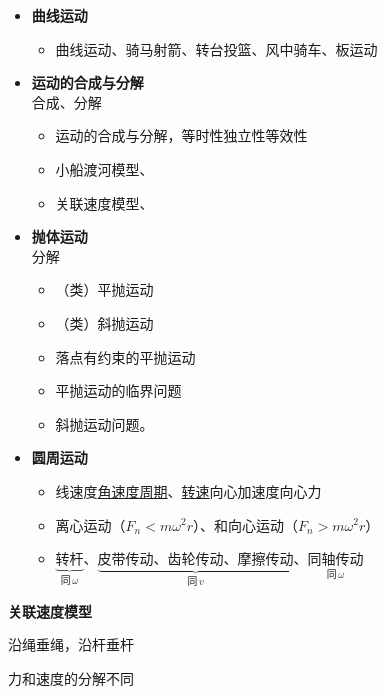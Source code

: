 \begin{itemize}
  \item \textbf{曲线运动}
  \begin{itemize}
    \item 曲线运动、骑马射箭、转台投篮、风中骑车、板运动
  \end{itemize}
  \item \textbf{运动的合成与分解}\\ 合成、分解
  \begin{itemize}
    \item 运动的合成与分解，\quad 等时性\quad 独立性\quad 等效性
    \item 小船渡河模型、
    \item 关联速度模型、 %
  \end{itemize}
  \item \textbf{抛体运动}\\ 分解
  \begin{itemize}
    \item （类）平抛运动
    \item （类）斜抛运动
    \item 落点有约束的平抛运动
    \item 平抛运动的临界问题
    \item 斜抛运动问题。
  \end{itemize}
  \item \textbf{圆周运动}\\ 
  \begin{itemize}
    \item 线速度\quad \underline{角速度}\quad \underline{周期}、\underline{转速}\quad 向心加速度\quad 向心力
    \item 离心运动（$F_n<m\omega^2 r$）、和向心运动（$F_n>m\omega^2 r$） %
    \item $\underbrace{\text{转杆}}_{\text{同}\,\omega}$、$\underbrace{\text{皮带传动、齿轮传动、摩擦传动}}_{\text{同}\,v}$、$\underset{\text{同}\,\omega}{\text{同轴传动}}$ %
  \end{itemize}
\end{itemize}
\textbf{关联速度模型}



沿绳垂绳，沿杆垂杆

力和速度的分解不同
